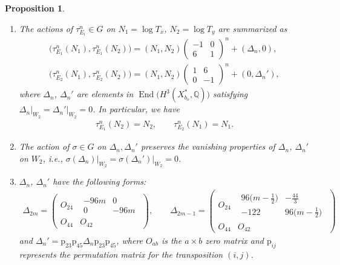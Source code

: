 \documentclass[pdftex]{sigma}
\numberwithin{equation}{section}
\newtheorem{Proposition}[Theorem]{Proposition}
\begin{document}
\begin{Proposition}\label{prop:tau1-tau2-actions}\quad
\begin{enumerate}\itemsep=0pt
\item[{\rm (1)}] The actions of $\tau_{E_{i}}^{n}\in G$ on $N_{1}=\log T_{x}$, $N_{2}=\log T_{y}$ are summarized as
\begin{gather*}
\big(\tau_{E_{1}}^{n}(N_{1}),\tau_{E_{1}}^{n}(N_{2})\big)=(N_{1},N_{2})\left(\begin{matrix}-1 & 0\\
6 & 1
\end{matrix}\right)^{n}+(\Delta_{n},0),\\
\big(\tau_{E_{2}}^{n}(N_{1}),\tau_{E_{2}}^{n}(N_{2})\big)=(N_{1},N_{2})\left(\begin{matrix}1 & 6\\
0 & -1 \end{matrix}\right)^{n}+(0,\Delta_{n}'),
\end{gather*}
where $\Delta_{n}$, $\Delta_{n}'$ are elements in $\operatorname{End}\big(H^{3}(X_{b_{o}}^{*},\mathbb{Q})\big)$ satisfying $\Delta_{n}\vert_{W_{2}}=\Delta_{n}'\vert_{W_{2}}=0$. In particular, we have
\begin{gather*}
\tau_{E_{1}}^{n}(N_{2})=N_{2},\qquad \tau_{E_{2}}^{n}(N_{1})=N_{1}.
\end{gather*}

\item[{\rm (2)}] The action of $\sigma\in G$ on $\Delta_{n},\Delta_{n}'$ preserves the vanishing properties of $\Delta_{n}$, $\Delta_{n}'$ on
$W_{2}$, i.e., $\sigma(\Delta_{n})\vert_{W_{2}}=\sigma(\Delta_{n}')\vert_{W_{2}}=0$.

\item[{\rm (3)}] $\Delta_{n}$, $\Delta_{n}'$ have the following forms:
\begin{gather*}
\Delta_{2m}=\left(\begin{matrix}
O_{24} & \begin{smallmatrix}-96m & 0\\
0 & -96m
\end{smallmatrix}\\
O_{44} & O_{42}
\end{matrix}\right),\qquad \Delta_{2m-1}=\left(\begin{matrix}
O_{24} & \begin{smallmatrix}96\big(m-\frac{1}{2}\big) & -\frac{44}{3}\\
-122 & 96\big(m-\frac{1}{2}\big)
\end{smallmatrix}\\
O_{44} & O_{42}
\end{matrix}\right)
\end{gather*}
and $\Delta_{n}'=\mathrm{p}_{23}\mathrm{p}_{45}\Delta_{n}\mathrm{p}_{23}\mathrm{p}_{45}$, where $O_{ab}$ is the $a\times b$ zero matrix and $\mathrm{p}_{ij}$ represents the permutation matrix for the transposition $(i,j)$.
\end{enumerate}\end{Proposition}
\end{document}
